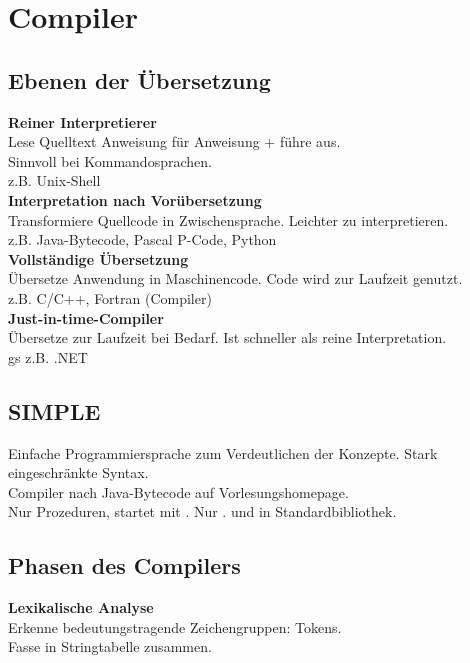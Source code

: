 

\section{Compiler}%
\label{cmp:sec:compiler}

\subsection{Ebenen der Übersetzung}%
\label{cmp:sub:ebenen}
\textbf{Reiner Interpretierer}\\
Lese Quelltext Anweisung für Anweisung + führe aus.\\
Sinnvoll bei Kommandosprachen.\\
z.B. Unix-Shell\\

\textbf{Interpretation nach Vorübersetzung}\\
Transformiere Quellcode in Zwischensprache. Leichter zu interpretieren.\\
z.B. Java-Bytecode, Pascal P-Code, Python\\

\textbf{Vollständige Übersetzung}\\
Übersetze Anwendung in Maschinencode. Code wird zur Laufzeit genutzt.\\
z.B. C/C++, Fortran (Compiler)\\

\textbf{Just-in-time-Compiler}\\
Übersetze zur Laufzeit bei Bedarf. Ist schneller als reine Interpretation.\\ gs
z.B. .NET

\subsection{SIMPLE}%
\label{cmp:sub:SIMPLE}
Einfache Programmiersprache zum Verdeutlichen der Konzepte.
Stark eingeschränkte Syntax.\\
Compiler nach Java-Bytecode auf Vorlesungshomepage.\\

Nur Prozeduren, startet mit . Nur .
 und  in Standardbibliothek.

\subsection{Phasen des Compilers}%
\label{cmp:sub:phasen}
\textbf{Lexikalische Analyse}\\
Erkenne bedeutungstragende Zeichengruppen: Tokens.\\
Fasse in Stringtabelle zusammen.\\

